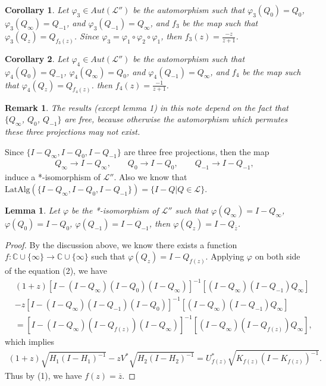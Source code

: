 \documentclass{amsart}
\newcommand{\LLL}{\mathcal L} %
\newcommand{\Lat}{\mathrm{Lat}}
\newcommand{\Alg}{\mathrm{Alg}}
\newcommand{\C}{\mathbb C} %
\newtheorem{corollary}{Corollary}[section]
\newtheorem{lemma}{Lemma}[section]
\newtheorem{remark}{Remark}[section]
\begin{document}
\begin{corollary}
Let $\varphi_{3} \in Aut(\LLL'')$ be the automorphism such that $\varphi_{3}(Q_{0}) = Q_{0}$, $\varphi_{3}(Q_{\infty}) = Q_{-1}$,
and $\varphi_{3}(Q_{-1}) = Q_{\infty}$, and $f_3$ be the map such that $\varphi_{3}(Q_{z}) = Q_{f_{3}(z)}$.
Since $\varphi_{3} = \varphi_{1}\circ \varphi_{2} \circ \varphi_{1}$, then $f_{3}(z) = \frac{-z}{z+1}$.
\end{corollary}

\begin{corollary}
Let $\varphi_{4} \in Aut(\LLL'')$ be the automorphism such that $\varphi_{4}(Q_{0}) = Q_{-1}$, $\varphi_{4}(Q_{\infty}) = Q_{0}$,
and $\varphi_{4}(Q_{-1}) = Q_{\infty}$, and $f_4$ be the map such that $\varphi_{4}(Q_{z}) = Q_{f_{4}(z)}$.
then $f_{4}(z) = \frac{-1}{z+1}$.
\end{corollary}

\begin{remark}
The results (except lemma 1) in this note depend on the fact that  $\{Q_{\infty}$, $Q_{0}$, $Q_{-1} \}$ are
free, because otherwise the automorphism which permutes these three projections may not exist.
\end{remark}

Since $\{I - Q_{\infty}, I - Q_{0}, I - Q_{-1} \}$ are three free projections, then the map
\begin{align*}
Q_{\infty} \rightarrow I - Q_{\infty}, \qquad Q_{0} \rightarrow I - Q_{0}, \qquad Q_{-1} \rightarrow I - Q_{-1},
\end{align*}
induce a *-isomorphism of $\LLL''$. Also we know that $\Lat\Alg(\{I - Q_{\infty}, I - Q_{0}, I - Q_{-1} \}) =
\{I - Q | Q \in \LLL \}$.

\begin{lemma}
Let $\varphi$ be the *-isomorphism of $\LLL''$ such that $\varphi(Q_{\infty}) = I - Q_{\infty}$, $\varphi(Q_{0}) = I - Q_{0}$,
$\varphi(Q_{-1}) = I - Q_{-1}$, then  $\varphi(Q_{z}) = I - Q_{\overline{z}}$.
\end{lemma}

\begin{proof}
By the discussion above, we know there exists a function $f : \C \cup \{\infty \} \rightarrow \C \cup \{\infty\}$ such
that $\varphi(Q_{z}) = I - Q_{f(z)}$.
Applying $\varphi$ on both side of the equation (2), we have
\begin{align*}
&(1+z)[I - (I - Q_{\infty})(I - Q_{0})(I - Q_{\infty})]^{-1}[(I - Q_{\infty})(I - Q_{-1})Q_{\infty}] \\
& - z[I - (I-Q_{\infty})(I - Q_{-1})(I - Q_{0})]^{-1}[(I - Q_{\infty})(I - Q_{-1})Q_{\infty}] \\
&= [I - (I - Q_{\infty})(I - Q_{f(z)})(I - Q_{\infty})]^{-1}[(I - Q_{\infty})(I - Q_{f(z)})Q_{\infty}],
\end{align*}
which implies
\begin{align*}
(1+z)\sqrt{H_{1}(I - H_{1})^{-1}} -zV^{*}\sqrt{H_{2}(I - H_{2})^{-1}} = U^{*}_{f(z)}\sqrt{K_{f(z)}(I - K_{f(z)})^{-1}}.
\end{align*}
Thus by (1), we have $f(z) = \overline{z}$.
\end{proof}
\end{document}
